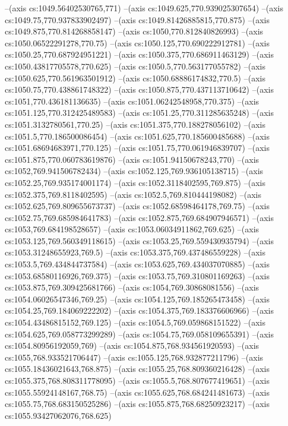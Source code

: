 --(axis cs:1049.56402530765,771)
--(axis cs:1049.625,770.939025307654)
--(axis cs:1049.75,770.937833902497)
--(axis cs:1049.81426885815,770.875)
--(axis cs:1049.875,770.814268858147)
--(axis cs:1050,770.812840826993)
--(axis cs:1050.06522291278,770.75)
--(axis cs:1050.125,770.690222912781)
--(axis cs:1050.25,770.687924951221)
--(axis cs:1050.375,770.686911463129)
--(axis cs:1050.43817705578,770.625)
--(axis cs:1050.5,770.563177055782)
--(axis cs:1050.625,770.561963501912)
--(axis cs:1050.68886174832,770.5)
--(axis cs:1050.75,770.438861748322)
--(axis cs:1050.875,770.437113710642)
--(axis cs:1051,770.436181136635)
--(axis cs:1051.06242548958,770.375)
--(axis cs:1051.125,770.312425489583)
--(axis cs:1051.25,770.311285635248)
--(axis cs:1051.3132780561,770.25)
--(axis cs:1051.375,770.188278056102)
--(axis cs:1051.5,770.186500086454)
--(axis cs:1051.625,770.185600485688)
--(axis cs:1051.68694683971,770.125)
--(axis cs:1051.75,770.061946839707)
--(axis cs:1051.875,770.060783619876)
--(axis cs:1051.94150678243,770)
--(axis cs:1052,769.941506782434)
--(axis cs:1052.125,769.936105138715)
--(axis cs:1052.25,769.935174001174)
--(axis cs:1052.3118402595,769.875)
--(axis cs:1052.375,769.8118402595)
--(axis cs:1052.5,769.810444198082)
--(axis cs:1052.625,769.809655673737)
--(axis cs:1052.68598464178,769.75)
--(axis cs:1052.75,769.685984641783)
--(axis cs:1052.875,769.684907946571)
--(axis cs:1053,769.684198528657)
--(axis cs:1053.06034911862,769.625)
--(axis cs:1053.125,769.560349118615)
--(axis cs:1053.25,769.559430935794)
--(axis cs:1053.31248655923,769.5)
--(axis cs:1053.375,769.437486559228)
--(axis cs:1053.5,769.434844737584)
--(axis cs:1053.625,769.434037070885)
--(axis cs:1053.68580116926,769.375)
--(axis cs:1053.75,769.310801169263)
--(axis cs:1053.875,769.309425681766)
--(axis cs:1054,769.30868081556)
--(axis cs:1054.06026547346,769.25)
--(axis cs:1054.125,769.185265473458)
--(axis cs:1054.25,769.184069222202)
--(axis cs:1054.375,769.183376606966)
--(axis cs:1054.43486815152,769.125)
--(axis cs:1054.5,769.059868151522)
--(axis cs:1054.625,769.058773299289)
--(axis cs:1054.75,769.058109655391)
--(axis cs:1054.80956192059,769)
--(axis cs:1054.875,768.934561920593)
--(axis cs:1055,768.933521706447)
--(axis cs:1055.125,768.932877211796)
--(axis cs:1055.18436021643,768.875)
--(axis cs:1055.25,768.809360216428)
--(axis cs:1055.375,768.808311778095)
--(axis cs:1055.5,768.807677419651)
--(axis cs:1055.55924148167,768.75)
--(axis cs:1055.625,768.684241481673)
--(axis cs:1055.75,768.683150525286)
--(axis cs:1055.875,768.68250923217)
--(axis cs:1055.93427062076,768.625)
